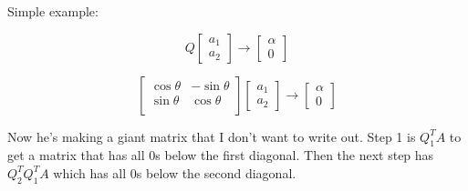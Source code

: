 Simple example:

\[
  Q \begin{bmatrix}
    a_1 \\ a_2
  \end{bmatrix} \rightarrow
  \begin{bmatrix}
    \alpha \\ 0
  \end{bmatrix}
\]

\[
  \begin{bmatrix}
    \cos\theta & -\sin\theta \\
    \sin\theta & \cos\theta \\
  \end{bmatrix}
  \begin{bmatrix}
    a_1 \\ a_2
  \end{bmatrix} \rightarrow
  \begin{bmatrix}
    \alpha \\ 0
  \end{bmatrix}
\]

Now he's making a giant matrix that I don't want to write out. Step 1 is $Q_1^T A$ to get a matrix that has all 0s below the first diagonal. Then the next step has $Q_2^T Q_1^T A$ which has all 0s below the second diagonal.